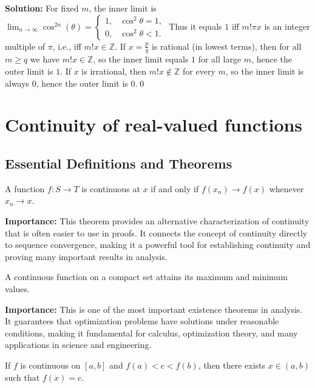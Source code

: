 \bigskip\noindent\textbf{Solution:}
For fixed $m$, the inner limit is $\lim_{n\to\infty}\cos^{2n}(\theta)=\begin{cases}1,& \cos^2\theta=1,\\ 0,& \cos^2\theta<1.\end{cases}$ Thus it equals $1$ iff $m!\pi x$ is an integer multiple of $\pi$, i.e., iff $m!x\in\mathbb{Z}$. If $x=\tfrac{p}{q}$ is rational (in lowest terms), then for all $m\ge q$ we have $m!x\in\mathbb{Z}$, so the inner limit equals $1$ for all large $m$, hence the outer limit is $1$. If $x$ is irrational, then $m!x\notin\mathbb{Z}$ for every $m$, so the inner limit is always $0$, hence the outer limit is $0$.\qed

\section{Continuity of real-valued functions}

\subsection*{Essential Definitions and Theorems}



\begin{theorem}
A function $f: S \to T$ is continuous at $x$ if and only if $f(x_n) \to f(x)$ whenever $x_n \to x$.
\end{theorem}

\noindent\textbf{Importance:} This theorem provides an alternative characterization of continuity that is often easier to use in proofs. It connects the concept of continuity directly to sequence convergence, making it a powerful tool for establishing continuity and proving many important results in analysis.



\begin{theorem}
A continuous function on a compact set attains its maximum and minimum values.
\end{theorem}

\noindent\textbf{Importance:} This is one of the most important existence theorems in analysis. It guarantees that optimization problems have solutions under reasonable conditions, making it fundamental for calculus, optimization theory, and many applications in science and engineering.



\begin{theorem}
If $f$ is continuous on $[a,b]$ and $f(a) < c < f(b)$, then there exists $x \in (a,b)$ such that $f(x) = c$.
\end{theorem}

